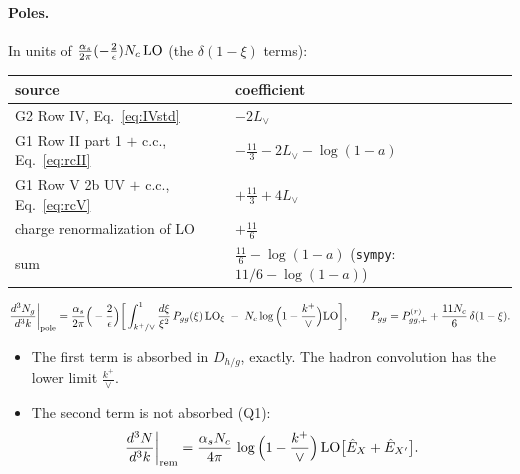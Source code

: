 \documentclass[10pt]{article}
\numberwithin{equation}{section}
\newcommand{\Lv}{L_{\vee}}
\newcommand{\Eh}{\hat E}
\begin{document}
\paragraph{Poles.} In units of $\frac{\alpha_s}{2\pi}(-\frac2\epsilon)N_c\,{\rm LO}$ (the $\delta(1-\xi)$ terms):
\begin{center}\small
\begin{tabular}{@{}ll@{}}\toprule
source & coefficient\\\midrule
G2 Row IV, Eq.~\eqref{eq:IVstd} & $-2\Lv$\\
G1 Row II part 1 $+$ c.c., Eq.~\eqref{eq:rcII} & $-\frac{11}{3}-2\Lv-\log(1-a)$\\
G1 Row V 2b UV $+$ c.c., Eq.~\eqref{eq:rcV} & $+\frac{11}{3}+4\Lv$\\
charge renormalization of LO & $+\frac{11}{6}$\\\midrule
sum & $\frac{11}{6}-\log(1-a)$ \quad(\texttt{sympy}: $11/6 - \log(1 - a)$)\\\bottomrule
\end{tabular}
\end{center}
\begin{equation}
\frac{d^3N_g}{d^3k}\bigg|_{\rm pole}=\frac{\alpha_s}{2\pi}\Big(-\frac{2}{\epsilon}\Big)\bigg[\int_{k^+/\vee}^1\frac{d\xi}{\xi^2}\,P_{gg}(\xi)\,{\rm LO}_\xi\;-\;N_c\log\Big(1-\frac{k^+}{\vee}\Big){\rm LO}\bigg],\qquad P_{gg}=P^{(r)}_{gg,+}+\frac{11N_c}{6}\,\delta(1-\xi).
\label{eq:pole}
\end{equation}
\begin{itemize}
\item The first term is absorbed in $D_{h/g}$, exactly. The hadron convolution has the lower limit $\frac{k^+}{\vee}$.
\item The second term is not absorbed (Q1):
\begin{equation}
\frac{d^3N}{d^3k}\bigg|_{\rm rem}=\frac{\alpha_sN_c}{4\pi}\,\log\Big(1-\frac{k^+}{\vee}\Big)\,{\rm LO}\big[\Eh_X+\Eh_{X'}\big].
\label{eq:rem}
\end{equation}
\end{itemize}
\end{document}
